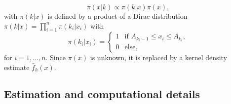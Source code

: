 \begin{equation*}
\pi\left(x|k\right)\propto \pi\left(k|x\right)\pi\left(x\right), 
\end{equation*}
with \(\pi \left(k|x\right)\) is defined by a product of a Dirac distribution \(\pi\left(k|x\right)=\prod_{i=1}^{n}\pi\left(k_{i}|x_{i}\right)\) with
\begin{equation*}
\pi\left(k_{i}|x_{i}\right)=\begin{cases}
  1  & \text{if } A_{k_{i}-1} \leq x_{i} \leq A_{k_{i}}, \\ 
  0 & \text{else, } 
\end{cases}
\end{equation*}
for \(i=1,\ldots,n\). Since \(\pi\left(x\right)\) is unknown, it is replaced by a kernel density estimate \(\hat{f}_{h}\left(x\right)\). 

\subsection{Estimation and computational details}

